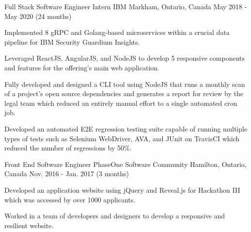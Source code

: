 


\begin{cventries}


\cventry
{Full Stack Software Engineer Intern} %
{IBM} %
{Markham, Ontario, Canada} %
{May 2018 - May 2020 (24 months)} %
{ %
\begin{cvitems}
\item {Implemented 8 gRPC and Golang-based microservices within a crucial data pipeline for IBM Security Guardium Insights.}
\item {Leveraged ReactJS, AngularJS, and NodeJS to develop 5 responsive components and features for the offering's main web application.}
\item {Fully developed and designed a CLI tool using NodeJS that runs a monthly scan of a project's open source dependencies and generates a report for review by the legal team which reduced an entirely manual effort to a single automated cron job.}
\item {Developed an automated E2E regression testing suite capable of running multiple types of tests such as Selenium WebDriver, AVA, and JUnit on TravisCI which reduced the number of regressions by 50\%.}
\end{cvitems}
}


\cventry
{Front End Software Engineer} %
{PhaseOne Software Community} %
{Hamilton, Ontario, Canada} %
{Nov. 2016 - Jan. 2017 (3 months)} %
{ %
\begin{cvitems}
\item {Developed an application website using jQuery and Reveal.js for Hackathon III which was accessed by over 1000 applicants.}
\item {Worked in a team of developers and designers to develop a responsive and resilient website.}
\end{cvitems}
}


\end{cventries}